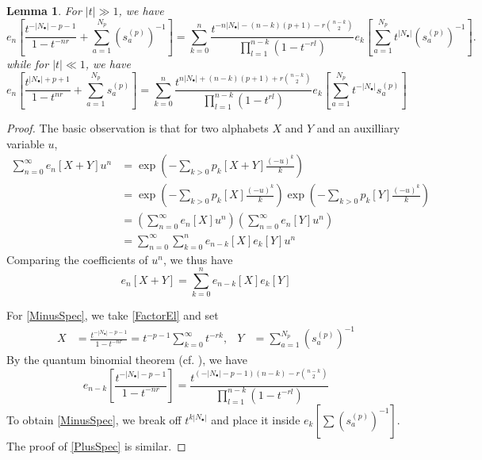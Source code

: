 \documentclass{amsart}
\newtheorem{lem}[thm]{Lemma}
\theoremstyle{remark}
\numberwithin{thm}{section}
\numberwithin{equation}{section}
\begin{document}
\begin{lem}\label{EigenStab}
For $|t|\gg 1$, we have
\begin{equation}
e_n\left[\frac{t^{-|N_\bullet|-p-1}}{1-t^{-nr}}+\sum_{a=1}^{N_p}\left(s^{(p)}_{a}\right)^{-1} \right]=\sum_{k=0}^n\frac{t^{-n|N_\bullet|-(n-k)(p+1)-r\binom{n-k}{2}}}{\displaystyle\prod_{l=1}^{n-k}(1-t^{-rl})}
e_k\left[ \sum_{a=1}^{N_p}t^{|N_\bullet|}\left(s^{(p)}_{a}\right)^{-1} \right].
\label{MinusSpec}
\end{equation}
while for $|t|\ll 1$, we have
\begin{equation}
e_n\left[\frac{t^{|N_\bullet|+p+1}}{1-t^{nr}}+\sum_{a=1}^{N_p}s^{(p)}_{a} \right]=\sum_{k=0}^n\frac{t^{n|N_\bullet|+(n-k)(p+1)+r\binom{n-k}{2}}}{\displaystyle\prod_{l=1}^{n-k}(1-t^{rl})}
e_k\left[ \sum_{a=1}^{N_p}t^{-|N_\bullet|}s^{(p)}_{a} \right]
\label{PlusSpec}
\end{equation}
\end{lem}

\begin{proof}
The basic observation is that for two alphabets $X$ and $Y$ and an auxilliary variable $u$,
\begin{align*}
    \sum_{n=0}^\infty e_n[X+Y]u^n
    &=\exp\left(-\sum_{k>0} p_k[X+Y] \frac{(-u)^k}{k}\right)\\
    &=\exp\left(-\sum_{k>0} p_k[X] \frac{(-u)^k}{k}\right)\exp\left(-\sum_{k>0} p_k[Y] \frac{(-u)^k}{k}\right)\\
    &=\left(\sum_{n=0}^\infty e_n[X]u^n\right)\left(\sum_{n=0}^\infty e_n[Y]u^n\right)\\
    &=\sum_{n=0}^\infty\sum_{k=0}^ne_{n-k}[X]e_k[Y] u^n
\end{align*}
Comparing the coefficients of $u^n$, we thus have
\begin{equation}
 e_n[X+Y]=\sum_{k=0}^n e_{n-k}[X]e_{k}[Y]
 \label{FactorEl}
\end{equation}


For \eqref{MinusSpec}, we take \eqref{FactorEl} and set
\begin{equation*}
 \begin{aligned}
    X&=\frac{t^{-|N_\bullet|-p-1}}{1-t^{-nr}}=t^{-p-1}\sum_{k=0}^\infty t^{-rk},&
    Y&=\sum_{a=1}^{N_p}\left(s_a^{(p)}\right)^{-1}
\end{aligned}   
\end{equation*}
By the quantum binomial theorem (cf. \cite[Example I.2.5]{Mac}), we have
\[
e_{n-k}\left[\frac{t^{-|N_\bullet|-p-1}}{1-t^{-nr}}\right]=
\frac{t^{(-|N_\bullet|-p-1)(n-k)-r\binom{n-k}{2}}}{\displaystyle\prod_{l=1}^{n-k}(1-t^{-rl})}
\]
To obtain \eqref{MinusSpec}, we break off $t^{k|N_\bullet|}$ and place it inside $e_k\left[\sum (s_a^{(p)})^{-1}\right]$.
The proof of \eqref{PlusSpec} is similar.
\end{proof}
\end{document}
